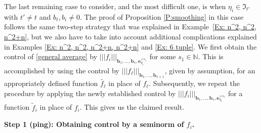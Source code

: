 \documentclass[11pt]{amsart}
\theoremstyle{definition}
\newcommand{\N}{{\mathbb N}}
\newcommand{\FI}{{\mathfrak I}}
\newcommand{\be}{{\mathbf{e}}}
\renewcommand{\b}{{\textbf{b}}}
\newcommand{\nnorm}[1]{\lvert\!|\!| #1|\!|\!\rvert}
\begin{document}
The last remaining case to consider, and the most difficult one, is when $\eta_i\in\FI_{t'}$ with $t'\neq t$ and $b_\ell, b_i\neq 0$. The proof of Proposition \ref{P:smoothing} in this case follows the same two-step strategy that was explained in Example~\ref{Ex: n^2, n^2, n^2+n}, but we also have to take into account additional complications explained in Examples
\ref{Ex: n^2, n^2, n^2+n, n^2+n} and \ref{Ex: 6 tuple}. We first obtain the control of \eqref{general average} by $\nnorm{f_i}_{{\b_1}, \ldots, {\b_{s}}, \be_{\eta_i}^{\times s_1}}$ for some $s_1\in\N$. This is accomplished by using the control by $\nnorm{f_\ell}_{{\b_1}, \ldots, {\b_{s+1}}}$, given by assumption, for an appropriately defined function $\tilde{f_\ell}$ in place of $f_\ell$. Subsequently, we repeat the procedure by applying the newly established control by $\nnorm{f_i}_{{\b_1}, \ldots, {\b_{s}}, \be_{\eta_i}^{\times s_1}}$ for a function $\tilde{f}_i$ in place of $f_i$. This gives us the claimed result.




\smallskip
\textbf{Step 1 (ping): Obtaining control by a seminorm of $f_i$.}
\smallskip
\end{document}

